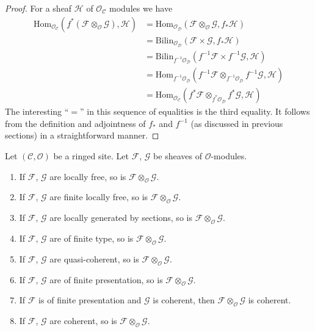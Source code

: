 \begin{proof}
For a sheaf $\mathcal{H}$ of $\mathcal{O}_{\mathcal{C}}$ modules we
have
\begin{align*}
\text{Hom}_{\mathcal{O}_{\mathcal{C}}}(
f^*(\mathcal{F} \otimes_{\mathcal{O}} \mathcal{G}), \mathcal{H})
& =
\text{Hom}_{\mathcal{O}_{\mathcal{D}}}(
\mathcal{F} \otimes_{\mathcal{O}} \mathcal{G}, f_*\mathcal{H}) \\
& =
\text{Bilin}_{\mathcal{O}_{\mathcal{D}}}(
\mathcal{F} \times \mathcal{G}, f_*\mathcal{H}) \\
& =
\text{Bilin}_{f^{-1}\mathcal{O}_{\mathcal{D}}}(
f^{-1}\mathcal{F} \times f^{-1}\mathcal{G}, \mathcal{H}) \\
& =
\text{Hom}_{f^{-1}\mathcal{O}_{\mathcal{D}}}(
f^{-1}\mathcal{F} \otimes_{f^{-1}\mathcal{O}_{\mathcal{D}}} f^{-1}\mathcal{G},
\mathcal{H}) \\
& =
\text{Hom}_{\mathcal{O}_{\mathcal{C}}}(
f^*\mathcal{F} \otimes_{f^*\mathcal{O}_{\mathcal{D}}} f^*\mathcal{G},
\mathcal{H})
\end{align*}
The interesting ``$=$'' in this sequence of equalities is the 
third equality. It follows from the definition and adjointness of
$f_*$ and $f^{-1}$ (as discussed in previous sections) in a
straightforward manner.
\end{proof}

\begin{lemma}
\label{lemma-tensor-product-permanence}
Let $(\mathcal{C}, \mathcal{O})$ be a ringed site.
Let $\mathcal{F}$, $\mathcal{G}$ be sheaves of $\mathcal{O}$-modules.
\begin{enumerate}
\item If $\mathcal{F}$, $\mathcal{G}$ are locally free,
so is $\mathcal{F} \otimes_\mathcal{O} \mathcal{G}$.
\item If $\mathcal{F}$, $\mathcal{G}$ are finite locally free,
so is $\mathcal{F} \otimes_\mathcal{O} \mathcal{G}$.
\item If $\mathcal{F}$, $\mathcal{G}$ are locally generated
by sections, so is $\mathcal{F}\otimes_\mathcal{O} \mathcal{G}$.
\item If $\mathcal{F}$, $\mathcal{G}$ are of finite type,
so is $\mathcal{F} \otimes_\mathcal{O} \mathcal{G}$.
\item If $\mathcal{F}$, $\mathcal{G}$ are quasi-coherent,
so is $\mathcal{F} \otimes_\mathcal{O} \mathcal{G}$.
\item If $\mathcal{F}$, $\mathcal{G}$ are of finite presentation,
so is $\mathcal{F} \otimes_\mathcal{O} \mathcal{G}$.
\item If $\mathcal{F}$ is of finite presentation and $\mathcal{G}$ is coherent,
then $\mathcal{F} \otimes_\mathcal{O} \mathcal{G}$ is coherent.
\item If $\mathcal{F}$, $\mathcal{G}$ are coherent,
so is $\mathcal{F} \otimes_\mathcal{O} \mathcal{G}$.
\end{enumerate}
\end{lemma}

